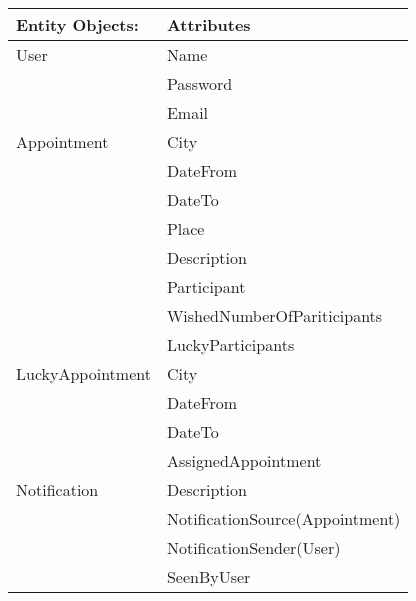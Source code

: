 {\tabulinesep=1.2mm
\begin{tabu}{ | p{3cm} | p{6cm} |}
    \hline
    Entity Objects: 		& 		Attributes    \\ \hline
    User 			        & 		Name          \\
                            &       Password       \\
                            &       Email         \\ \hline
    Appointment             &       City          \\
                            &       DateFrom      \\
                            &       DateTo        \\ 
                            &       Place         \\ 
                            &       Description         \\ 
                            &       Participant         \\ 
                            &       WishedNumberOfPariticipants         \\ 
                            &       LuckyParticipants \\\hline 
    LuckyAppointment        &       City          \\
                            &       DateFrom      \\
                            &       DateTo        \\ 
                            &       AssignedAppointment\\\hline
    Notification            &       Description\\
                            &       NotificationSource(Appointment)\\
                            &       NotificationSender(User)\\
                            &       SeenByUser\\\hline
\end{tabu}
}
